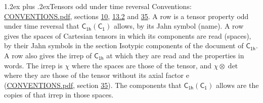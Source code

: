 \documentclass[10pt,a4paper]{article}
\makeatletter
\renewcommand\section{\@startsection{section}{1}{\z@}{-3ex plus -1ex minus -.2ex}%
  {1.2ex plus .2ex}{\normalfont\large\sffamily\bfseries\color{parttitle}}}
\numberwithin{equation}{section}
\newcommand{\grp}[1]{\mathsf{#1}}
\newcommand{\irrprod}{\otimes}
\makeatother
\begin{document}
\section{Tensors odd under time reversal}\label{s:time_odd}
Conventions: \href{../../CONVENTIONS.pdf}{CONVENTIONS.pdf}, sections \href{../../../rotation/CONVENTIONS.pdf\#conv.10}{10}, \href{../../../rotation/CONVENTIONS.pdf\#conv.13.2}{13.2} and \href{../../CONVENTIONS.pdf\#conv.35}{35}.
\leavevmode\label{n:head.name.property}A row is a tensor property odd under time reversal that $\grp{C_{1h}}(\grp{C_{1}})$ allows, by its Jahn symbol (name). \label{n:head.spaces}A row gives the spaces of Cartesian tensors in which its components are read (spaces), by their Jahn symbols in the section Isotypic components of the document of \href{../../../rotation/data/pdf/C1h.pdf}{$\grp{C_{1h}}$}. \label{n:head.properties}A row also gives the irrep of $\grp{C_{1h}}$ at which they are read and the properties in words. The irrep is $\chi$ where the spaces are those of the tensor, and $\chi \irrprod \det$ where they are those of the tensor without its axial factor e (\href{../../CONVENTIONS.pdf}{CONVENTIONS.pdf}, section \href{../../CONVENTIONS.pdf\#conv.35}{35}). The components that $\grp{C_{1h}}(\grp{C_{1}})$ allows are the copies of that irrep in those spaces.
\end{document}
